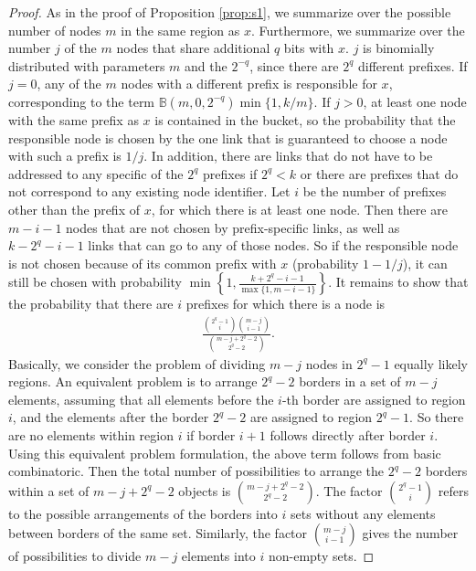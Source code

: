 \documentclass[10pt, conference, compsocconf, letterpaper]{IEEEtran}
\renewcommand{\binom}{\mathbb{B}}
\begin{document}
\begin{proof}
As in the proof of Proposition \ref{prop:s1}, we summarize over the possible number
of nodes $m$ in the same region as $x$. Furthermore, we summarize over the number $j$ of the $m$ nodes that share additional 
$q$ bits with $x$. $j$ is binomially distributed with parameters $m$ and the
$2^{-q}$, since there are $2^q$ different prefixes. 
If $j=0$, any of the $m$ nodes with a different prefix is responsible for $x$, corresponding
 to the term $\binom(m,0,2^{-q})\min\{1, k/m\}$.
If $j>0$, at least one node with the same prefix as $x$ is contained in the bucket, so the
probability that the responsible node is chosen by the one link that is guaranteed to choose
a node with such a prefix  is $1/j$.
In addition, there are links that do not have to be addressed to any specific of the $2^q$ 
prefixes if $2^q < k$ or there are prefixes that do not correspond to any existing node identifier. 
Let $i$ be the number of prefixes other than the prefix of $x$, for which there is at least one node.
Then there are $m-i-1$ nodes that are not chosen by prefix-specific links, as well as 
$k-2^q-i-1$ links that can go to any of those nodes. So if the responsible node is not chosen
because of its common prefix with $x$ (probability $1-1/j$), it can still be chosen with
probability  $\min\left\lbrace 1,\frac{k+2^{q}-i-1}{\max\{1,m-i-1\}} \right\rbrace$.
It remains to show that the probability that there are $i$ prefixes for which there is a node
is 
\begin{align*}
\frac{{2^q-1 \choose i}{m-j \choose i-1}}{{m-j+2^q-2 \choose 2^q-2}}. 
\end{align*}
Basically, we consider the problem of dividing $m-j$ nodes in $2^q-1$ equally likely regions.
An equivalent problem is to arrange $2^q-2$ borders in a set of $m-j$ elements, assuming
that all elements before the $i$-th border are assigned to region $i$, and the elements
after the border $2^q-2$ are assigned to region $2^q-1$.
So there are no elements within region $i$ if border $i+1$ follows directly after border $i$.
Using this equivalent problem formulation, the above term follows from basic
combinatoric. 
Then the total number of possibilities to arrange the $2^q-2$ borders within a set of 
$m-j+2^q-2$ objects is ${m-j+2^q-2 \choose 2^q-2}$.
The factor ${2^q-1 \choose i}$ refers to the possible arrangements of the borders
into $i$ sets without any elements between borders of the same set.
Similarly, the factor ${m-j \choose i-1}$ gives the number of
possibilities to divide $m-j$ elements into $i$ non-empty sets.\end{proof}
\end{document}
